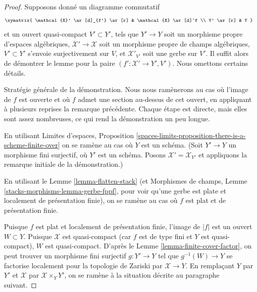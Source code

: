 \begin{proof}
Supposons donné un diagramme commutatif
$$
\xymatrix{
\mathcal{X}' \ar[d]_{f'} \ar[r] & \mathcal{X} \ar[d]^f \\
Y' \ar[r] & Y
}
$$
et un ouvert quasi-compact $V' \subset Y'$, tels que
$Y' \to Y$ soit un morphisme propre d'espaces algébriques,
$\mathcal{X}' \to \mathcal{X}$ soit un morphisme propre de champs algébriques,
$V' \subset Y'$ s'envoie surjectivement sur $V$, et
$\mathcal{X}'_{V'}$ soit une gerbe sur $V'$.
Il suffit alors de démontrer le lemme pour la paire
$(f' : \mathcal{X}' \to Y', V')$. Nous omettons certains détails.

\medskip\noindent
Stratégie générale de la démonstration. Nous nous ramènerons
au cas où l'image de $f$ est ouverte et où $f$
admet une section au-dessus de cet ouvert, en appliquant à plusieurs reprises
la remarque précédente. Chaque étape est directe, mais elles sont
assez nombreuses, ce qui rend la démonstration un peu longue.

\medskip\noindent
En utilisant Limites d'espaces, Proposition
\ref{spaces-limits-proposition-there-is-a-scheme-finite-over}
on se ramène au cas où $Y$ est un schéma.
(Soit $Y' \to Y$ un morphisme fini surjectif, où $Y'$ est
un schéma. Posons $\mathcal{X}' = \mathcal{X}_{Y'}$ et appliquons
la remarque initiale de la démonstration.)

\medskip\noindent
En utilisant le Lemme \ref{lemma-flatten-stack}
(et Morphismes de champs, Lemme \ref{stacks-morphisms-lemma-gerbe-fppf},
pour voir qu'une gerbe est plate et localement de présentation finie),
on se ramène au cas où $f$ est plat et de présentation finie.

\medskip\noindent
Puisque $f$ est plat et localement de
présentation finie, l'image de $|f|$ est un ouvert $W \subset Y$.
Puisque $\mathcal{X}$ est quasi-compact (car $f$ est de type fini
et $Y$ est quasi-compact), $W$ est quasi-compact.
D'après le Lemme \ref{lemma-finite-cover-factor},
on peut trouver un morphisme fini surjectif $g : Y' \to Y$
tel que $g^{-1}(W) \to Y$ se factorise localement pour la topologie de Zariski
par $\mathcal{X} \to Y$.
En remplaçant $Y$ par $Y'$ et $\mathcal{X}$ par
$\mathcal{X} \times_Y Y'$, on se ramène à la situation
décrite au paragraphe suivant.


\end{proof}
